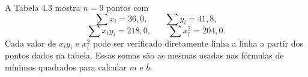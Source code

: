 A Tabela 4.3 mostra $n=9$ pontos com
\[
\sum x_i = 36{,}0,\qquad \sum y_i = 41{,}8,
\]
\[
\sum x_i y_i = 218{,}0,\qquad \sum x_i^{2} = 204{,}0.
\]
Cada valor de $x_i y_i$ e $x_i^{2}$ pode ser verificado diretamente linha a linha a partir dos pontos dados na tabela. Essas somas são as mesmas usadas nas fórmulas de mínimos quadrados para calcular $m$ e $b$.  